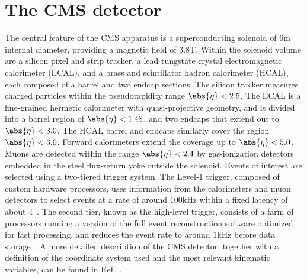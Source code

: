 \section{The CMS detector}
\label{sec:detector}

The central feature of the CMS apparatus is a superconducting solenoid of $6$\unit{m} internal diameter, 
providing a magnetic field of $3.8$\unit{T}. 
Within the solenoid volume are a silicon pixel and strip tracker, 
a lead tungstate crystal electromagnetic calorimeter (ECAL), 
and a brass and scintillator hadron calorimeter (HCAL), 
each composed of a barrel and two endcap sections.
The silicon tracker measures charged particles within the pseudorapidity range $\abs{\eta} < 2.5$. 
The ECAL is a fine-grained hermetic calorimeter with quasi-projective geometry,
and is divided into a barrel region of $\abs{\eta} < 1.48$, and two endcaps that extend out to $\abs{\eta} < 3.0$.
The HCAL barrel and endcaps similarly cover the region $\abs{\eta} < 3.0$.
Forward calorimeters extend the coverage up to $\abs{\eta} < 5.0$.
Muons are detected within the range $\abs{\eta} < 2.4$ 
by gas-ionization detectors embedded in the steel flux-return yoke outside the solenoid.
Events of interest are selected using a two-tiered trigger system. 
The Level-1 trigger, composed of custom hardware processors, uses information from the calorimeters and muon detectors
to select events at a rate of around $100$\unit{kHz} within a fixed latency of about $4$\mus~\cite{Sirunyan:2020zal}. 
The second tier, known as the high-level trigger,
consists of a farm of processors running a version of the full event reconstruction software optimized for fast processing, 
and reduces the event rate to around $1$\unit{kHz} before data storage~\cite{Khachatryan:2016bia}. 
A more detailed description of the CMS detector, 
together with a definition of the coordinate system used and the most relevant kinematic variables, can be found in Ref.~\cite{Chatrchyan:2008zzk}. 
